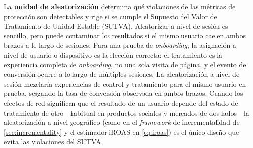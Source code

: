 La \textbf{unidad de aleatorización} determina qué violaciones de las métricas de protección
son detectables y rige si se cumple el Supuesto del Valor de Tratamiento de Unidad Estable
(SUTVA). Aleatorizar a nivel de sesión es sencillo, pero puede contaminar los resultados si
el mismo usuario cae en ambos brazos a lo largo de sesiones. Para una prueba de
\emph{onboarding}, la asignación a nivel de usuario o dispositivo es la elección correcta:
el tratamiento es la experiencia completa de \emph{onboarding}, no una sola visita de página,
y el evento de conversión ocurre a lo largo de múltiples sesiones. La aleatorización a nivel
de sesión mezclaría experiencias de control y tratamiento para el mismo usuario en prueba,
sesgando la tasa de conversión observada en ambos brazos. Cuando los efectos de red
significan que el resultado de un usuario depende del estado de tratamiento de otro---habitual
en productos sociales y mercados de dos lados---la aleatorización a nivel geográfico (como en
el \emph{framework} de incrementalidad de \cref{sec:incrementality} y el estimador iROAS en
\cref{eq:iroas}) es el único diseño que evita las violaciones del SUTVA.

